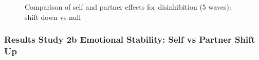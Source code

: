 \documentclass[
  singlecolumn]{article}
\begin{document}
\begin{figure}


\caption{\label{fig-results-disinhibition-self-partner-down-long-comparison}Comparison
of self and partner effects for disinhibition (5 waves): shift down vs
null}

\end{figure}%

\newpage{}

\subsubsection{Results Study 2b Emotional Stability: Self vs Partner
Shift
Up}\label{results-study-2b-emotional-stability-self-vs-partner-shift-up}
\end{document}
